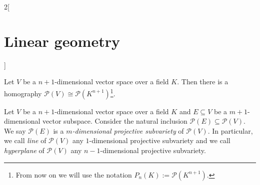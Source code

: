 \documentclass[../../../main_math.tex]{subfiles}
\begin{document}
\begin{multicols}{2}[\section{Linear geometry}]
\begin{definition}
  \end{definition}
  \begin{proposition}
    Let $V$ be a $n+1$-dimensional vector space over a field $K$. Then there is a homography $\mathcal{P}(V)\cong \mathcal{P}(K^{n+1})$\footnote{From now on we will use the notation $P_n(K):=\mathcal{P}(K^{n+1})$.}.
  \end{proposition}
  \begin{definition}
    Let $V$ be a $n+1$-dimensional vector space over a field $K$ and $E\subseteq V$ be a $m+1$-dimensional vector subspace. Consider the natural inclusion $\mathcal{P}(E)\subseteq\mathcal{P}(V)$. We say $\mathcal{P}(E)$ is a \emph{$m$-dimensional projective subvariety} of $\mathcal{P}(V)$. In particular, we call \emph{line} of $\mathcal{P}(V)$ any $1$-dimensional projective subvariety and we call \emph{hyperplane} of $\mathcal{P}(V)$ any $n-1$-dimensional projective subvariety.
  \end{definition}

\end{multicols}
\end{document}
